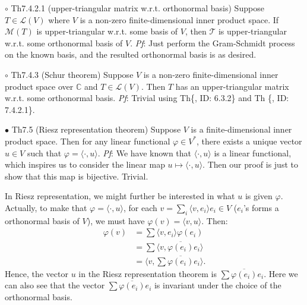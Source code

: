 \documentclass{article}
\begin{document}
\begin{Th}{$\circ$ Th7.4.2.1 (upper-triangular matrix w.r.t. orthonormal basis)}
    Suppose $T\in\mathcal{L}(V)$ where $V$ is a non-zero finite-dimensional inner product space. If $\mathcal{M}(T)$ is upper-triangular w.r.t. some basis of $V$, then $\mathcal{T}$ is upper-triangular w.r.t. some orthonormal basis of $V$.
    \tcblower
    \textit{Pf}: Just perform the Gram-Schmidt process on the known basis, and the resulted orthonormal basis is as desired.
\end{Th}

\begin{Th}{$\circ$ Th7.4.3 (Schur theorem)}
    Suppose $V$ is a non-zero finite-dimensional inner product space over $\mathbb{C}$ and $T\in\mathcal{L}(V)$. Then $T$ has an upper-triangular matrix w.r.t. some orthonormal basis.
    \tcblower
    \textit{Pf}: Trivial using Th\{, ID: 6.3.2\} and Th \{, ID: 7.4.2.1\}.
\end{Th}

\begin{Th}{$\bullet$ Th7.5 (Riesz representation theorem)}
    Suppose $V$ is a finite-dimensional inner product space. Then for any linear functional $\varphi\in V^\ast$, there exists a unique vector $u\in V$ such that $\varphi = \langle \cdot, u\rangle$.
    \tcblower
    \textit{Pf}: We have known that $\langle \cdot, u\rangle$ is a linear functional, which inspires us to consider the linear map $u\mapsto \langle \cdot, u\rangle$. Then our proof is just to show that this map is bijective. Trivial.
\end{Th}

\begin{Rmk}{}
    In Riesz representation, we might further be interested in what $u$ is given $\varphi$. Actually, to make that $\varphi = \langle \cdot, u\rangle$, for each $v=\sum_{i} \langle v, e_i\rangle e_i\in V$ ($e_i$'s forms a orthonormal basis of $V$), we must have $\varphi(v) = \langle v, u\rangle$. Then:
    $$
    \begin{aligned}
        \varphi(v) &= \sum \langle v, e_i\rangle \varphi(e_i)\\
        &= \sum \langle v, \overline{\varphi(e_i)} e_i\rangle\\
        &= \langle v, \sum \overline{\varphi(e_i)} e_i\rangle.
    \end{aligned}
    $$
    \textcolor{Th}{Hence, the vector $u$ in the Riesz representation theorem is $\sum \overline{\varphi(e_i)} e_i$.}
    Here we can also see that \textcolor{Th}{the vector $\sum \overline{\varphi(e_i)} e_i$ is invariant under the choice of the orthonormal basis.}
\end{Rmk}
\end{document}

